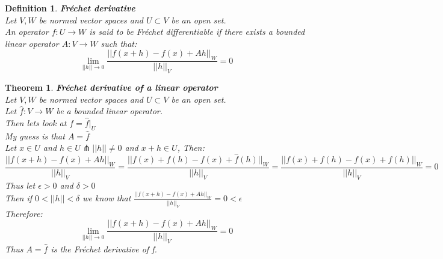 \documentclass[12pt]{extarticle}
\theoremstyle{plain}
\newtheorem{thm}{Theorem}[section]
\theoremstyle{Definition}
\newtheorem{def.}{Definition}[section]
\theoremstyle{Definition}
\theoremstyle{plain}
\begin{document}
\begin{def.} \textbf{Fréchet derivative} \\ 
		Let $V,W$ be normed vector spaces and $U \subset V$ be an open set. \\ 
		An operator $f : U \to W$ is said to be Fréchet differentiable if there exists a bounded linear operator $A : V \to W$ such that: \\ 
		$$\lim_{||h||\to0} \frac{||f(x+h) - f(x) + Ah||_W}{||h||_V} = 0$$
\end{def.} 

\begin{thm} \textbf{Fréchet derivative of a linear operator} \\ 
	Let $V,W$ be normed vector spaces and $U \subset V$ be an open set. \\ 
	Let $\hat{f} : V \to W$ be a bounded linear operator. \\
	Then lets look at $f = \hat{f}|_{U}$ \\ 
	My guess is that $A = \hat{f}$ \\ 
	Let $x \in U$ and $h \in U \pitchfork ||h|| \not = 0$ and $x+h \in U$, Then: \\ 
	$$\frac{||f(x+h) - f(x) + Ah||_W}{||h||_V} = \frac{||f(x)+f(h) - f(x) + \hat{f}(h)||_W}{||h||_V} = \frac{||f(x)+f(h) - f(x) + f(h)||_W}{||h||_V}= 0$$
	Thus let $\epsilon > 0$ and $\delta > 0$ \\ 
	Then if $0 < ||h|| < \delta$ we know that  
	$\frac{||f(x+h) - f(x) + Ah||_W}{||h||_V} = 0 < \epsilon$ \\ 
	Therefore: 
	$$\lim_{||h||\to0} \frac{||f(x+h) - f(x) + Ah||_W}{||h||_V} = 0$$
	Thus $A = \hat{f}$ is the Fréchet derivative  of f. 
\end{thm}


\newpage
\end{document}
